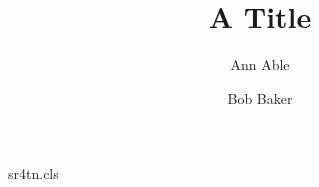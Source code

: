 \begin{filecontents*}[overwrite]{sr4tn.cls}
\newtoks\tntoks
\def\titlenote#1{\raisebox{9pt}{$\ast$}\global\tntoks={#1}}
\renewenvironment{abstract}{\insert\footins{\footnotesize$^{\ast}$\the\tntoks\par}\section*{Abstract}}{\par}
\end{filecontents*}
\documentclass{sr4tn}\title{A Title}
\author{Ann Able \and Bob Baker}\maketitle\begin{abstract}An abstract.\end{abstract}Text.
